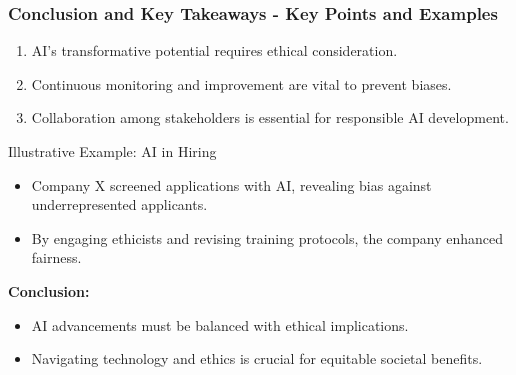 \documentclass{beamer}
\begin{document}
\begin{frame}[fragile]
    \frametitle{Conclusion and Key Takeaways - Key Points and Examples}
    \begin{enumerate}
        \item AI's transformative potential requires ethical consideration.
        \item Continuous monitoring and improvement are vital to prevent biases.
        \item Collaboration among stakeholders is essential for responsible AI development.
    \end{enumerate}

    \begin{block}{Illustrative Example: AI in Hiring}
        \begin{itemize}
            \item Company X screened applications with AI, revealing bias against underrepresented applicants.
            \item By engaging ethicists and revising training protocols, the company enhanced fairness.
        \end{itemize}
    \end{block}

    \textbf{Conclusion:}
    \begin{itemize}
        \item AI advancements must be balanced with ethical implications.
        \item Navigating technology and ethics is crucial for equitable societal benefits.
    \end{itemize}
\end{frame}
\end{document}
